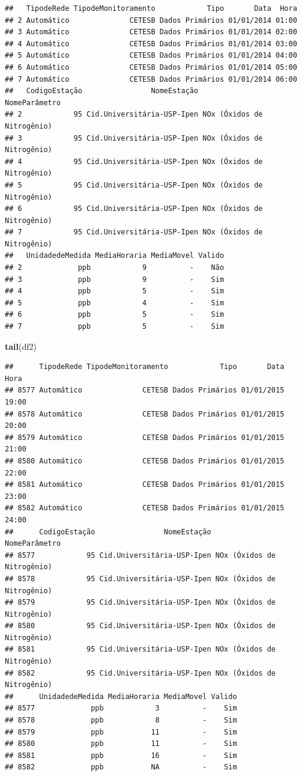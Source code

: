 \documentclass[]{book}
\newenvironment{Shaded}{\begin{snugshade}}{\end{snugshade}}
\newcommand{\KeywordTok}[1]{\textcolor[rgb]{0.13,0.29,0.53}{\textbf{#1}}}
\newcommand{\NormalTok}[1]{#1}
\begin{document}
\begin{verbatim}
##   TipodeRede TipodeMonitoramento            Tipo       Data  Hora
## 2 Automático              CETESB Dados Primários 01/01/2014 01:00
## 3 Automático              CETESB Dados Primários 01/01/2014 02:00
## 4 Automático              CETESB Dados Primários 01/01/2014 03:00
## 5 Automático              CETESB Dados Primários 01/01/2014 04:00
## 6 Automático              CETESB Dados Primários 01/01/2014 05:00
## 7 Automático              CETESB Dados Primários 01/01/2014 06:00
##   CodigoEstação                NomeEstação              NomeParâmetro
## 2            95 Cid.Universitária-USP-Ipen NOx (Óxidos de Nitrogênio)
## 3            95 Cid.Universitária-USP-Ipen NOx (Óxidos de Nitrogênio)
## 4            95 Cid.Universitária-USP-Ipen NOx (Óxidos de Nitrogênio)
## 5            95 Cid.Universitária-USP-Ipen NOx (Óxidos de Nitrogênio)
## 6            95 Cid.Universitária-USP-Ipen NOx (Óxidos de Nitrogênio)
## 7            95 Cid.Universitária-USP-Ipen NOx (Óxidos de Nitrogênio)
##   UnidadedeMedida MediaHoraria MediaMovel Valido
## 2             ppb            9          -    Não
## 3             ppb            9          -    Sim
## 4             ppb            5          -    Sim
## 5             ppb            4          -    Sim
## 6             ppb            5          -    Sim
## 7             ppb            5          -    Sim
\end{verbatim}

\begin{Shaded}
\begin{Highlighting}[]
\KeywordTok{tail}\NormalTok{(df2)}
\end{Highlighting}
\end{Shaded}

\begin{verbatim}
##      TipodeRede TipodeMonitoramento            Tipo       Data  Hora
## 8577 Automático              CETESB Dados Primários 01/01/2015 19:00
## 8578 Automático              CETESB Dados Primários 01/01/2015 20:00
## 8579 Automático              CETESB Dados Primários 01/01/2015 21:00
## 8580 Automático              CETESB Dados Primários 01/01/2015 22:00
## 8581 Automático              CETESB Dados Primários 01/01/2015 23:00
## 8582 Automático              CETESB Dados Primários 01/01/2015 24:00
##      CodigoEstação                NomeEstação              NomeParâmetro
## 8577            95 Cid.Universitária-USP-Ipen NOx (Óxidos de Nitrogênio)
## 8578            95 Cid.Universitária-USP-Ipen NOx (Óxidos de Nitrogênio)
## 8579            95 Cid.Universitária-USP-Ipen NOx (Óxidos de Nitrogênio)
## 8580            95 Cid.Universitária-USP-Ipen NOx (Óxidos de Nitrogênio)
## 8581            95 Cid.Universitária-USP-Ipen NOx (Óxidos de Nitrogênio)
## 8582            95 Cid.Universitária-USP-Ipen NOx (Óxidos de Nitrogênio)
##      UnidadedeMedida MediaHoraria MediaMovel Valido
## 8577             ppb            3          -    Sim
## 8578             ppb            8          -    Sim
## 8579             ppb           11          -    Sim
## 8580             ppb           11          -    Sim
## 8581             ppb           16          -    Sim
## 8582             ppb           NA          -    Sim
\end{verbatim}
\end{document}
